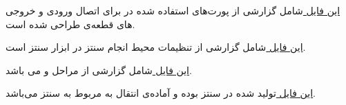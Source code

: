 \href{https://github.com/VahidZee/SkeinHashingHDL/blob/master/SynthesisFiles/report_pinout.html}{
	این فایل
} 
شامل گزارشی از پورت‌های استفاده شده در 
برای اتصال ورودی و خروجی های قطعه‌ی طراحی شده است.

\href{https://github.com/VahidZee/SkeinHashingHDL/blob/master/SynthesisFiles/report_envsettings.html}{
	این فایل
} 
شامل گزارشی از تنظیمات محیط انجام سنتز در ابزار سنتز است.

\href{https://github.com/VahidZee/SkeinHashingHDL/blob/master/SynthesisFiles/report_pad.html}{
	این فایل
} 
شامل گزارشی از مراحل 
و
می باشد.


\href{https://github.com/VahidZee/SkeinHashingHDL/blob/master/SynthesisFiles/report_pad.html}{
	این فایل
} 
تولید شده در سنتز بوده و آماده‌ی انتقال به 
مربوط به سنتز می‌باشد.



